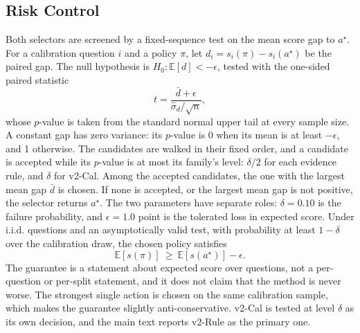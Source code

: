 \documentclass[sigconf,anonymous,review]{acmart}
\begin{document}
\subsection{Risk Control}
\label{sec:risk}
Both selectors are screened by a fixed-sequence test on the mean score gap to $a^{\star}$.
For a calibration question $i$ and a policy $\pi$, let $d_i=s_i(\pi)-s_i(a^{\star})$ be the paired gap.
The null hypothesis is $H_0:\mathbb{E}[d]<-\epsilon$, tested with the one-sided paired statistic
\begin{equation}
t=\frac{\bar d+\epsilon}{\hat\sigma_d/\sqrt{n}},
\label{eq:stat}
\end{equation}
whose $p$-value is taken from the standard normal upper tail at every sample size.
A constant gap has zero variance: its $p$-value is 0 when its mean is at least $-\epsilon$, and 1 otherwise.
The candidates are walked in their fixed order, and a candidate is accepted while its $p$-value is at most its family's level: $\delta/2$ for each evidence rule, and $\delta$ for v2-Cal.
Among the accepted candidates, the one with the largest mean gap $\bar d$ is chosen.
If none is accepted, or the largest mean gap is not positive, the selector returns $a^{\star}$.
The two parameters have separate roles: $\delta=0.10$ is the failure probability, and $\epsilon=1.0$ point is the tolerated loss in expected score.
Under i.i.d. questions and an asymptotically valid test, with probability at least $1-\delta$ over the calibration draw, the chosen policy satisfies
\begin{equation}
\mathbb{E}[s(\pi)]\ \ge\ \mathbb{E}[s(a^{\star})]-\epsilon.
\label{eq:guarantee}
\end{equation}
The guarantee is a statement about expected score over questions, not a per-question or per-split statement, and it does not claim that the method is never worse.
The strongest single action is chosen on the same calibration sample, which makes the guarantee slightly anti-conservative.
v2-Cal is tested at level $\delta$ as its own decision, and the main text reports v2-Rule as the primary one.
\end{document}

